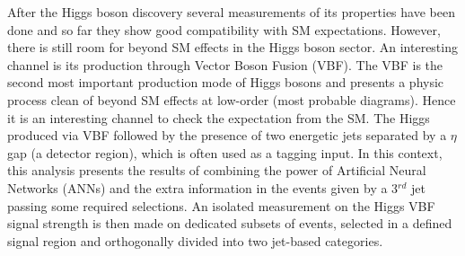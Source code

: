 After the Higgs boson discovery several measurements of its properties have been done and so far they show good compatibility with SM expectations. However, there is still room for beyond SM effects in the Higgs boson sector. An interesting channel is its production through Vector Boson Fusion (VBF). The VBF is the second most important production mode of Higgs bosons and presents a physic process clean of beyond SM effects at low-order (most probable diagrams). Hence it is an interesting channel to check the expectation from the SM. The Higgs produced via VBF followed by the presence of two energetic jets separated by a $\eta$ gap (a detector region), which is often used as a tagging input. In this context, this analysis presents the results of combining the power of Artificial Neural Networks (ANNs) and the extra information in the events given by a 3$^{rd}$ jet passing some required selections. An isolated measurement on the Higgs VBF signal strength is then made on dedicated subsets of events, selected in a defined signal region and orthogonally divided into two jet-based categories.